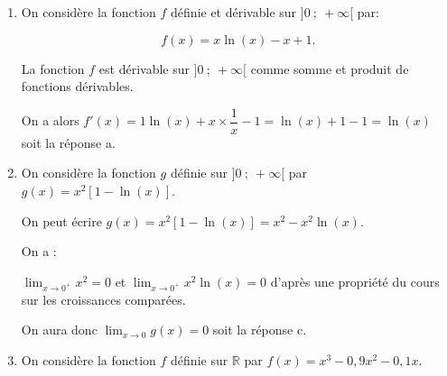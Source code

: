 \documentclass[11pt]{article}
\newcommand{\R}{\mathbb{R}}
\begin{document}
\begin{enumerate}
\item On considère la fonction $f$ définie et dérivable sur $]0~;~+\infty[$ par:

\[f(x) = x \ln(x) - x + 1.\]

La fonction $f$ est dérivable sur $]0~;~+\infty[$  comme somme et produit de fonctions dérivables. 

On a alors  $f'(x)=1\ln(x)+x \times \dfrac{1}{x}-1=\ln(x)+1-1=\ln(x)$ soit la réponse a.

\item On considère la fonction $g$ définie sur $]0~;~+\infty[$ par $g(x) = x^2[1 - \ln (x)]$.


On peut écrire $g(x) = x^2[1 - \ln (x)]=x^2-x^2\ln(x)$.

On a : 

$\displaystyle\lim_{x \to 0^+} x^2 = 0$ et $\displaystyle\lim_{x \to 0^+} x^2\ln(x) = 0$ d'après une propriété du cours sur les croissances comparées.

On aura donc $\displaystyle\lim_{x \to 0} g(x) = 0$ soit la réponse c.
\item On considère la fonction $f$ définie sur $\R$ par $f(x) = x^3 - 0,9x^2 -0,1x$.

%
%
%
%
%
%


\end{enumerate}
\end{document}
